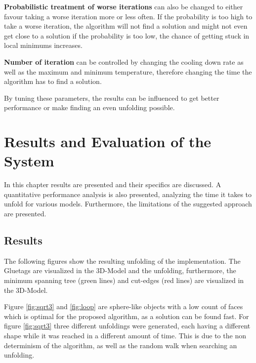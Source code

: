 \documentclass[draft,final]{vutinfth} %
\begin{document}
\textbf{Probabilistic treatment of worse iterations} can also be changed to either favour taking a worse iteration more or less often. If the probability is too high to take a worse iteration, the algorithm will not find a solution and might not even get close to a solution if the probability is too low, the chance of getting stuck in local minimums increases.

\textbf{Number of iteration} can be controlled by changing the cooling down rate as well as the maximum and minimum temperature, therefore changing the time the algorithm has to find a solution.

By tuning these parameters, the results can be influenced to get better performance or make finding an even unfolding possible.

\chapter{Results and Evaluation of the System}
\label{chap:reseval}
In this chapter results are presented and their specifics are discussed. A quantitative performance analysis is also presented, analyzing the time it takes to unfold for various models. Furthermore, the limitations of the suggested approach are presented.

\section{Results}
The following figures show the resulting unfolding of the implementation. The Gluetags are visualized in the 3D-Model and the unfolding, furthermore, the minimum spanning tree (green lines) and cut-edges (red lines) are visualized in the 3D-Model.

Figure \ref{fig:sqrt3} and \ref{fig:loop} are sphere-like objects with a low count of faces which is optimal for the proposed algorithm, as a solution can be found fast. For figure \ref{fig:sqrt3} three different unfoldings were generated, each having a different shape while it was reached in a different amount of time. This is due to the non determinism of the algorithm, as well as the random walk when searching an unfolding.
\end{document}
